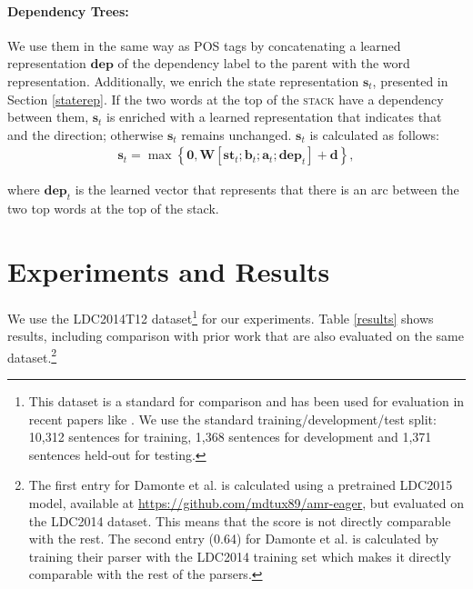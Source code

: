 \documentclass[11pt,a4paper]{article}
\begin{document}
\paragraph{Dependency Trees:}  We use them in the same way as POS tags by concatenating a 
learned representation $\mathbf{dep}$ of the dependency label to the parent with the word 
representation. Additionally, we enrich the state representation $\mathbf{s}_t$, 
 presented in Section \ref{staterep}. If the two words at the top of the \textsc{stack} have  a 
 dependency between them, $\mathbf{s}_t$ is enriched 
 with a learned representation that indicates that and the 
direction; otherwise $\mathbf{s}_t$ remains unchanged.
 $\mathbf{s}_t$ is calculated as follows:
\begin{align*}
\mathbf{s}_t = \max \left\{\mathbf{0}, \mathbf{W}[\mathbf{st}_t; \mathbf{b}_t; \mathbf{a}_t; \mathbf{dep}_t] + \mathbf{d}\right\},
\end{align*}

\noindent where $\mathbf{dep}_t$ is the learned vector that represents that there is an 
arc between the two top words at the top of the stack.
 
\section{Experiments and Results}

We use the LDC2014T12 dataset\footnote{This dataset is a standard for comparison and has been used for 
evaluation in recent papers like \cite{WangXP15, 
goodman-vlachos-naradowsky:2016:P16-1,zhouemnlp}. We use the standard training/development/test
split: 10,312 sentences for training, 1,368 sentences
for development and 1,371 sentences held-out for
testing. } for our experiments. Table \ref{results} shows results, 
including comparison with prior work that are also evaluated on the same 
dataset.\footnote{The first entry for Damonte et al. is calculated using a pretrained LDC2015 
model, available at \url{https://github.com/mdtux89/amr-eager}, but evaluated on the LDC2014 dataset. 
This means that the score is not directly comparable with the rest. The second entry (0.64)
for Damonte et al. is calculated by training their parser with the LDC2014 training set which makes it directly 
comparable with the rest of the parsers.} 
\end{document}
